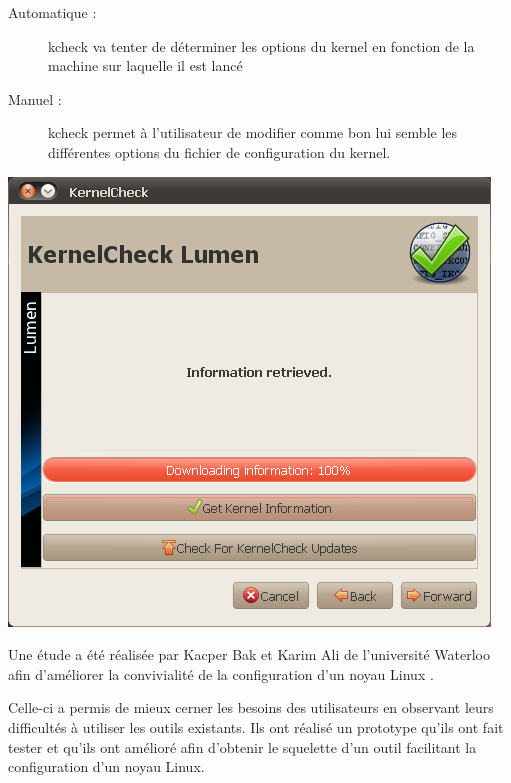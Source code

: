 \documentclass[16pts]{report}
\begin{document}
\begin{description}
    \begin{description}
        \item[Automatique :] kcheck va tenter de déterminer les options du kernel
            en fonction de la machine sur laquelle il est lancé
        \item[Manuel :] kcheck permet à l’utilisateur de modifier comme bon lui
            semble les différentes options du fichier de configuration du kernel.
    \end{description}
        \includegraphics[scale=0.8]{illustrations/kernel_check.png}\\
\end{description}

Une étude a été réalisée par Kacper Bak et Karim Ali de l’université Waterloo
afin d’améliorer la convivialité de la configuration d’un noyau Linux
\cite{Waterloo:Etude}.

Celle-ci a permis de mieux cerner les besoins des utilisateurs en observant
leurs difficultés à utiliser les outils existants. Ils ont réalisé un prototype
qu’ils ont fait tester et qu’ils ont amélioré afin d’obtenir le squelette d’un
outil facilitant la configuration d’un noyau Linux. \\
\end{document}
